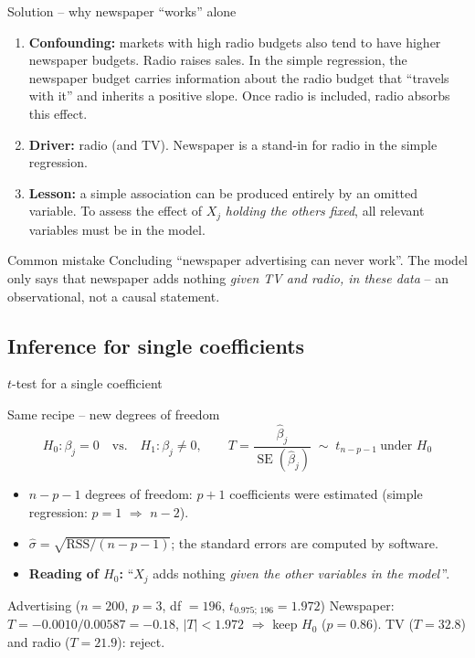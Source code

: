 \documentclass[aspectratio=169,11pt]{beamer}
\begin{document}
\begin{frame}{Solution -- why newspaper ``works'' alone}
  \begin{enumerate}\setlength{\itemsep}{4pt}
    \item \textbf{Confounding:} markets with high radio budgets also tend to
          have higher newspaper budgets. Radio raises sales. In the simple
          regression, the newspaper budget carries information about the
          radio budget that ``travels with it'' and inherits a positive
          slope. Once radio is included, radio absorbs this effect.
    \item \textbf{Driver:} radio (and TV). Newspaper is a stand-in for radio
          in the simple regression.
    \item \textbf{Lesson:} a simple association can be produced entirely by
          an omitted variable. To assess the effect of $X_j$
          \emph{holding the others fixed}, all relevant variables must be in
          the model.
  \end{enumerate}
  \begin{alertblock}{Common mistake}
    Concluding ``newspaper advertising can never work''. The model only says
    that newspaper adds nothing \emph{given TV and radio, in these data} --
    an observational, not a causal statement.
  \end{alertblock}
\end{frame}

\subsection{Inference for single coefficients}

\begin{frame}{$t$-test for a single coefficient}
  \begin{block}{Same recipe -- new degrees of freedom}
    \[
      H_0:\beta_j=0 \quad\text{vs.}\quad H_1:\beta_j\neq0,
      \qquad
      T=\frac{\hat\beta_j}{\operatorname{SE}(\hat\beta_j)}\;\sim\;t_{n-p-1}\ \text{under }H_0
    \]
  \end{block}
  \begin{itemize}\setlength{\itemsep}{3pt}
    \item $n-p-1$ degrees of freedom: $p+1$ coefficients were estimated
          (simple regression: $p=1$ $\Rightarrow$ $n-2$).
    \item $\hat\sigma=\sqrt{\text{RSS}/(n-p-1)}$; the standard errors are
          computed by software.
    \item \textbf{Reading of $H_0$:} ``$X_j$ adds nothing \emph{given the
          other variables in the model}\,''.
  \end{itemize}
  \begin{exampleblock}{Advertising ($n=200$, $p=3$, df $=196$, $t_{0.975;\,196}=1.972$)}
    Newspaper: $T=-0.0010/0.00587=-0.18$, $|T|<1.972$ $\Rightarrow$ keep
    $H_0$ ($p=0.86$). TV ($T=32.8$) and radio ($T=21.9$): reject.
  \end{exampleblock}
\end{frame}
\end{document}
